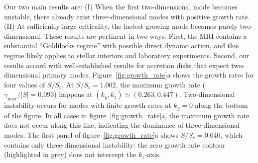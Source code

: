 \documentclass[openacc]{rsproca_new}%
\newcommand{\SSC}{S/S_{c}}
\begin{document}
Our two main results are: 
(I) When the first two-dimensional mode becomes unstable, there already exist three-dimensional modes with positive growth rate. 
(II) At sufficiently large criticality, the fastest-growing mode becomes purely two-dimensional. 
These results are pertinent in two ways. 
First, the MRI contains a substantial ``Goldilocks regime'' with possible direct dynamo action, and this regime likely applies to stellar interiors and laboratory experiments. 
Second, our results accord with well-established results for accretion disks that expect two-dimensional primary modes.
Figure~\ref{fig:growth_rate}a shows the growth rates for four values of $\SSC$. 
At $\SSC=1.002$, the maximum growth rate ($\gamma_{\max}/|S|=0.093$) happens at $(k_{y},k_{z})\simeq(0.263,0.447)$.
Two-dimensional instability occurs for modes with finite growth rates at $k_{y} = 0$ along the bottom of the figure.
In all cases in figure~\ref{fig:growth_rate}a, the maximum growth rate does not occur along this line, indicating the dominance of three-dimensional modes.
The first panel of figure~\ref{fig:growth_rate}a shows $\SSC=0.640$, which contains only three-dimensional instability: the zero growth rate contour (highlighted in grey) does not intercept the $k_{z}$-axis.
\end{document}

